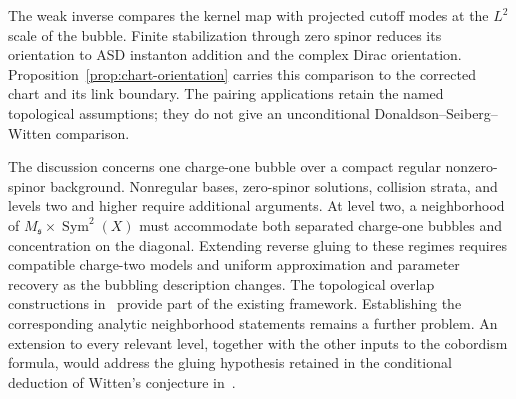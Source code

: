 \documentclass[11pt]{amsart}
\theoremstyle{definition}
\theoremstyle{remark}
\theoremstyle{plain}
\begin{document}
The weak inverse compares the kernel map with projected cutoff modes
at the $L^2$ scale of the bubble.  Finite stabilization through zero
spinor reduces its orientation to ASD instanton addition and the
complex Dirac orientation.  Proposition~\ref{prop:chart-orientation}
carries this comparison to the corrected chart and its link boundary.
The pairing applications retain the named topological assumptions;
they do not give an unconditional Donaldson--Seiberg--Witten comparison.

The discussion concerns one charge-one bubble over a compact regular
nonzero-spinor background.  Nonregular bases, zero-spinor solutions,
collision strata, and levels two and higher require additional arguments.
At level two, a neighborhood of $M_{\mathfrak s}\times\operatorname{Sym}^2(X)$
must accommodate both separated charge-one bubbles and concentration on
the diagonal.  Extending reverse gluing to these regimes requires
compatible charge-two models and uniform approximation and parameter
recovery as the bubbling description changes.  The topological overlap
constructions in~\cite{FeehanLenessCobordism} provide part of the existing
framework.  Establishing the corresponding analytic neighborhood
statements remains a further problem.  An extension to every relevant
level, together with the other inputs to the cobordism formula, would
address the gluing hypothesis retained in the conditional deduction of
Witten's conjecture in~\cite{FeehanLenessWitten}.
\end{document}
